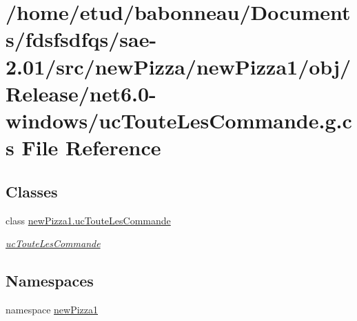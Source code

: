 \hypertarget{Release_2net6_80-windows_2ucTouteLesCommande_8g_8cs}{}\section{/home/etud/babonneau/\+Documents/fdsfsdfqs/sae-\/2.01/src/new\+Pizza/new\+Pizza1/obj/\+Release/net6.0-\/windows/uc\+Toute\+Les\+Commande.g.\+cs File Reference}
\label{Release_2net6_80-windows_2ucTouteLesCommande_8g_8cs}
\subsection*{Classes}
\begin{DoxyCompactItemize}
\item 
class \hyperlink{classnewPizza1_1_1ucTouteLesCommande}{new\+Pizza1.\+uc\+Toute\+Les\+Commande}
\begin{DoxyCompactList}\small\item\em \hyperlink{classnewPizza1_1_1ucTouteLesCommande}{uc\+Toute\+Les\+Commande} \end{DoxyCompactList}\end{DoxyCompactItemize}
\subsection*{Namespaces}
\begin{DoxyCompactItemize}
\item 
namespace \hyperlink{namespacenewPizza1}{new\+Pizza1}
\end{DoxyCompactItemize}
